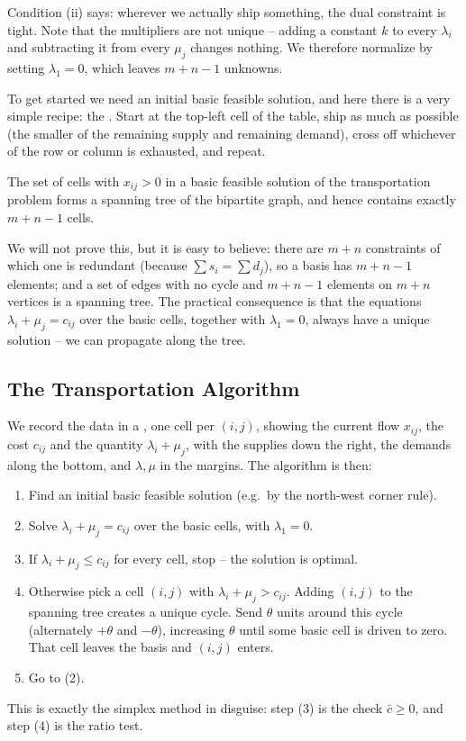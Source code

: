 Condition (ii) says: wherever we actually ship something, the dual constraint is tight. Note that the multipliers are not unique -- adding a constant $k$ to every $\lambda_i$ and subtracting it from every $\mu_j$ changes nothing. We therefore normalize by setting $\lambda_1 = 0$, which leaves $m + n - 1$ unknowns.

To get started we need an initial basic feasible solution, and here there is a very simple recipe: the . Start at the top-left cell of the table, ship as much as possible (the smaller of the remaining supply and remaining demand), cross off whichever of the row or column is exhausted, and repeat.

\begin{theorem}
    The set of cells with $x_{ij} > 0$ in a basic feasible solution of the transportation problem forms a spanning tree of the bipartite graph, and hence contains exactly $m + n - 1$ cells.
\end{theorem}

We will not prove this, but it is easy to believe: there are $m + n$ constraints of which one is redundant (because $\sum s_i = \sum d_j$), so a basis has $m + n - 1$ elements; and a set of edges with no cycle and $m+n-1$ elements on $m+n$ vertices is a spanning tree. The practical consequence is that the equations $\lambda_i + \mu_j = c_{ij}$ over the basic cells, together with $\lambda_1 = 0$, always have a unique solution -- we can propagate along the tree.

\subsection{The Transportation Algorithm}

We record the data in a , one cell per $(i,j)$, showing the current flow $x_{ij}$, the cost $c_{ij}$ and the quantity $\lambda_i + \mu_j$, with the supplies down the right, the demands along the bottom, and $\lambda, \mu$ in the margins. The algorithm is then:
\begin{enumerate}[label=(\arabic*)]
    \item Find an initial basic feasible solution (e.g.\ by the north-west corner rule).
    \item Solve $\lambda_i + \mu_j = c_{ij}$ over the basic cells, with $\lambda_1 = 0$.
    \item If $\lambda_i + \mu_j \leq c_{ij}$ for every cell, stop -- the solution is optimal.
    \item Otherwise pick a cell $(i,j)$ with $\lambda_i + \mu_j > c_{ij}$. Adding $(i,j)$ to the spanning tree creates a unique cycle. Send $\theta$ units around this cycle (alternately $+\theta$ and $-\theta$), increasing $\theta$ until some basic cell is driven to zero. That cell leaves the basis and $(i,j)$ enters.
    \item Go to (2).
\end{enumerate}
This is exactly the simplex method in disguise: step (3) is the check $\bar c \geq 0$, and step (4) is the ratio test.

